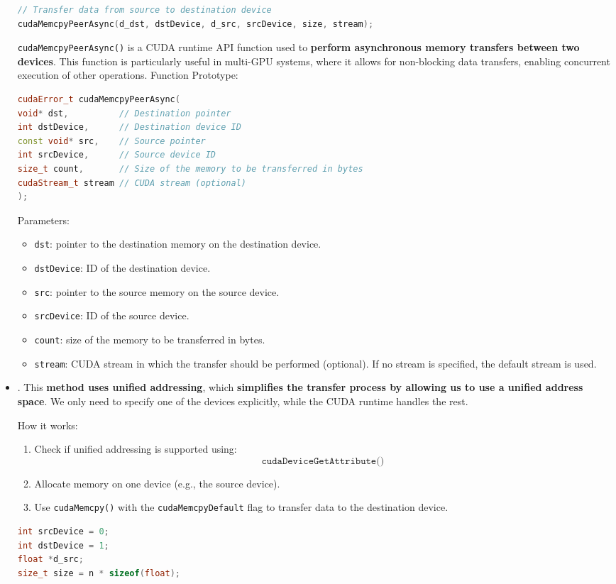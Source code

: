 \begin{itemize}
\begin{examplebox}
\begin{lstlisting}[language=C++]
// Transfer data from source to destination device
cudaMemcpyPeerAsync(d_dst, dstDevice, d_src, srcDevice, size, stream);\end{lstlisting}
  \end{examplebox}
  \texttt{cudaMemcpyPeerAsync()} is a CUDA runtime API function used to \textbf{perform asynchronous memory transfers between two devices}. This function is particularly useful in multi-GPU systems, where it allows for non-blocking data transfers, enabling concurrent execution of other operations. Function Prototype:
  \begin{lstlisting}[language=C++]
cudaError_t cudaMemcpyPeerAsync(
void* dst,          // Destination pointer
int dstDevice,      // Destination device ID
const void* src,    // Source pointer
int srcDevice,      // Source device ID
size_t count,       // Size of the memory to be transferred in bytes
cudaStream_t stream // CUDA stream (optional)
);\end{lstlisting}
  Parameters:
  \begin{itemize}
    \item \texttt{dst}: pointer to the destination memory on the destination device.
    \item \texttt{dstDevice}: ID of the destination device.
    \item \texttt{src}: pointer to the source memory on the source device.
    \item \texttt{srcDevice}: ID of the source device.
    \item \texttt{count}: size of the memory to be transferred in bytes.
    \item \texttt{stream}: CUDA stream in which the transfer should be performed (optional). If no stream is specified, the default stream is used.
  \end{itemize}


  \item {}. This \textbf{method uses unified addressing}, which \textbf{simplifies the transfer process by allowing us to use a unified address space}. We only need to specify one of the devices explicitly, while the CUDA runtime handles the rest.

  How it works:
  \begin{enumerate}
    \item Check if unified addressing is supported using:
    \begin{equation*}
      \texttt{cudaDeviceGetAttribute()}
    \end{equation*}
    \item Allocate memory on one device (e.g., the source device).
    \item Use \texttt{cudaMemcpy()} with the \texttt{cudaMemcpyDefault} flag to transfer data to the destination device.
  \end{enumerate}
  \begin{examplebox}
    \begin{lstlisting}[language=C++]
int srcDevice = 0;
int dstDevice = 1;
float *d_src;
size_t size = n * sizeof(float);


\end{lstlisting}
\end{examplebox}
\end{itemize}
